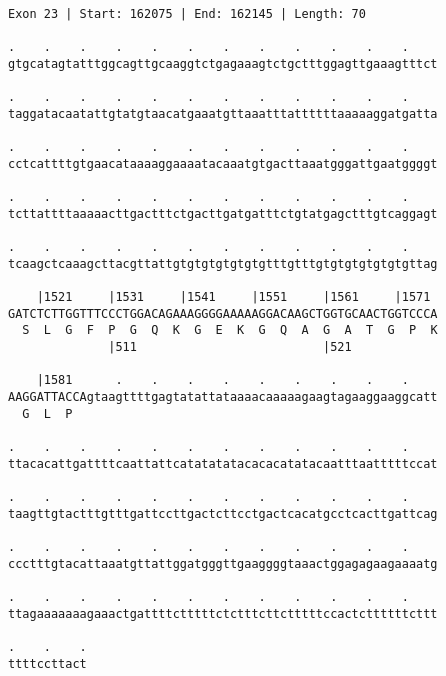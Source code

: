 \documentclass{article}
\begin{document}
\begin{Verbatim}
Exon 23 | Start: 162075 | End: 162145 | Length: 70
 
.    .    .    .    .    .    .    .    .    .    .    .    
gtgcatagtatttggcagttgcaaggtctgagaaagtctgctttggagttgaaagtttct
  
.    .    .    .    .    .    .    .    .    .    .    .    
taggatacaatattgtatgtaacatgaaatgttaaatttattttttaaaaaggatgatta
  
.    .    .    .    .    .    .    .    .    .    .    .    
cctcattttgtgaacataaaaggaaaatacaaatgtgacttaaatgggattgaatggggt
  
.    .    .    .    .    .    .    .    .    .    .    .    
tcttattttaaaaacttgactttctgacttgatgatttctgtatgagctttgtcaggagt
  
.    .    .    .    .    .    .    .    .    .    .    .    
tcaagctcaaagcttacgttattgtgtgtgtgtgtgtttgtttgtgtgtgtgtgtgttag
  
    |1521     |1531     |1541     |1551     |1561     |1571 
GATCTCTTGGTTTCCCTGGACAGAAAGGGGAAAAAGGACAAGCTGGTGCAACTGGTCCCA
  S  L  G  F  P  G  Q  K  G  E  K  G  Q  A  G  A  T  G  P  K
              |511                          |521            
  
    |1581      .    .    .    .    .    .    .    .    .    
AAGGATTACCAgtaagttttgagtatattataaaacaaaaagaagtagaaggaaggcatt
  G  L  P                                                   
  
.    .    .    .    .    .    .    .    .    .    .    .    
ttacacattgattttcaattattcatatatatacacacatatacaatttaatttttccat
  
.    .    .    .    .    .    .    .    .    .    .    .    
taagttgtactttgtttgattccttgactcttcctgactcacatgcctcacttgattcag
  
.    .    .    .    .    .    .    .    .    .    .    .    
ccctttgtacattaaatgttattggatgggttgaaggggtaaactggagagaagaaaatg
  
.    .    .    .    .    .    .    .    .    .    .    .    
ttagaaaaaaagaaactgattttctttttctctttcttctttttccactcttttttcttt
  
.    .    .
ttttccttact
\end{Verbatim}
\newpage
\end{document}
